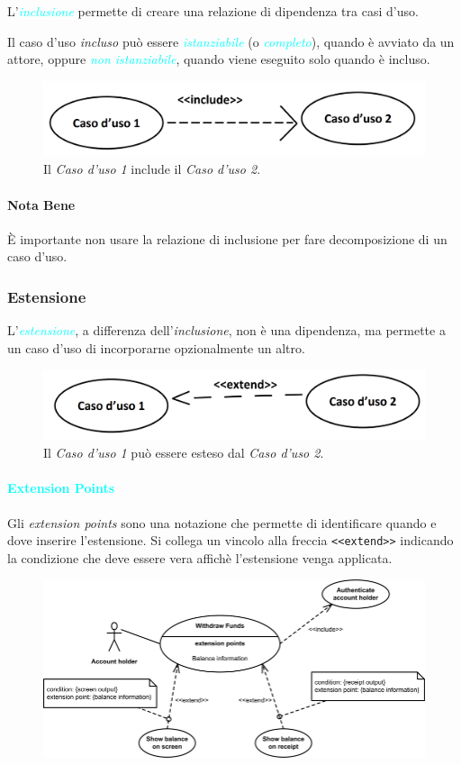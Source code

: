 L'\emph{\textcolor{cyan}{inclusione}} permette di creare una relazione di dipendenza tra casi d'uso.

Il caso d'uso \emph{incluso} può essere \emph{\textcolor{cyan}{istanziabile}} (o \emph{\textcolor{cyan}{completo}}),
quando è avviato da un attore, oppure \emph{\textcolor{cyan}{non istanziabile}}, quando viene eseguito solo quando è incluso.

\begin{figure}[h]
    \centering
    \includegraphics[scale=0.4]{img/include.png}
    \caption{Il \emph{Caso d'uso 1} include il \emph{Caso d'uso 2}.}
\end{figure}

\paragraph{Nota Bene} È importante non usare la relazione di inclusione per fare decomposizione di un caso d'uso.

\subsubsection{Estensione}

L'\emph{\textcolor{cyan}{estensione}}, a differenza dell'\emph{inclusione}, non è una dipendenza, ma
permette a un caso d'uso di incorporarne opzionalmente un altro.

\begin{figure}[h]
    \centering
    \includegraphics[scale=0.4]{img/extend.png}
    \caption{Il \emph{Caso d'uso 1} può essere esteso dal \emph{Caso d'uso 2}.}
\end{figure}

\paragraph{\textcolor{cyan}{Extension Points}}
Gli \emph{extension points} sono una notazione che permette di identificare quando
e dove inserire l'estensione. Si collega un vincolo alla freccia \verb|<<extend>>| indicando
la condizione che deve essere vera affichè l'estensione venga applicata.

\begin{figure}[h]
    \centering
    \includegraphics[scale=0.4]{img/extensionpoint.png}
\end{figure}